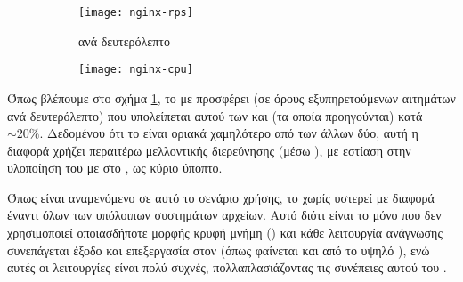 \begin{figure}
    \begin{minipage}[c][\textheight]{\textwidth}
        \begin{subfigure}[c][0.5\textheight]{\textwidth}
            \caption{ ανά δευτερόλεπτο}
            \texttt{[image: nginx-rps]}
            \label{fig:nginx-rps}
        \end{subfigure}
        \begin{subfigure}[c][0.5\textheight]{\textwidth}
            \caption{}
            \texttt{[image: nginx-cpu]}
            \label{fig:nginx-cpu}
        \end{subfigure}
        \caption{}
        \label{fig:nginx}
    \end{minipage}
\end{figure}


Όπως βλέπουμε στο σχήμα \ref{fig:nginx-rps}, το \viofs{} με 
προσφέρει  (σε όρους εξυπηρετούμενων αιτημάτων ανά δευτερόλεπτο)
που υπολείπεται αυτού των  και  (τα οποία προηγούνται) κατά
\(\sim 20\%\). Δεδομένου ότι το  είναι οριακά χαμηλότερο από των
άλλων δύο, αυτή η διαφορά χρήζει περαιτέρω μελλοντικής διερεύνησης (μέσω
), με εστίαση στην υλοποίηση του \viofs{} με  στο \osv{}, ως κύριο ύποπτο.

Όπως είναι αναμενόμενο σε αυτό το σενάριο χρήσης, το \viofs{} χωρίς 
υστερεί με διαφορά έναντι όλων των υπόλοιπων συστημάτων αρχείων. Αυτό διότι
είναι το μόνο που δεν χρησιμοποιεί οποιασδήποτε μορφής κρυφή μνήμη ()
και κάθε λειτουργία ανάγνωσης συνεπάγεται έξοδο και επεξεργασία στον \host{}
(όπως φαίνεται και από το υψηλό ), ενώ αυτές οι λειτουργίες είναι
πολύ συχνές, πολλαπλασιάζοντας τις συνέπειες αυτού του .
